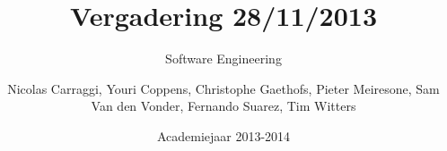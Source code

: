\author{Nicolas Carraggi, Youri Coppens, Christophe Gaethofs, Pieter Meiresone, Sam Van den Vonder, Fernando Suarez, Tim Witters}
\title{Vergadering 28/11/2013}
\subtitle{Software Engineering} 
\date{Academiejaar 2013-2014}


\makeassignment